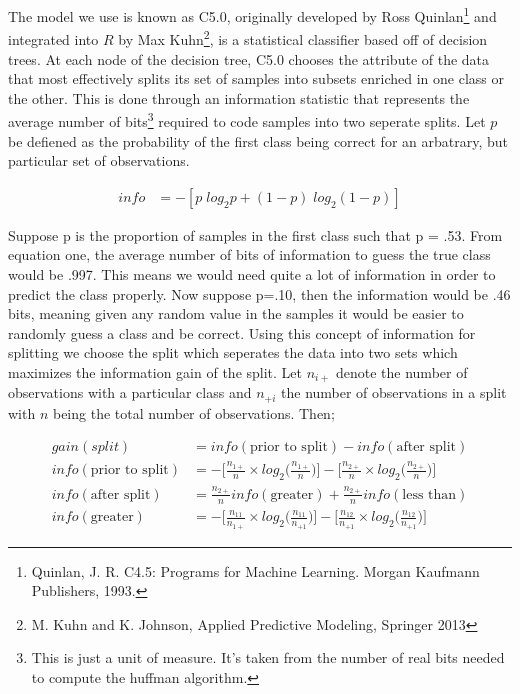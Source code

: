 \documentclass[11pt]{article}\usepackage[]{graphicx}\usepackage[]{color}
\begin{document}
The model we use is known as C5.0, originally developed by Ross Quinlan\footnote{Quinlan, J. R. C4.5: Programs for Machine Learning. Morgan Kaufmann Publishers, 1993.} and integrated into $R$ by Max Kuhn\footnote{M. Kuhn and K. Johnson, Applied Predictive Modeling, Springer 2013}, is a statistical classifier based off of decision trees. At each node of the decision tree, C5.0 chooses the attribute of the data that most effectively splits its set of samples into subsets enriched in one class or the other. This is done through an information statistic that represents the average number of bits\footnote{This is just a unit of measure. It's taken from the number of real bits needed to compute the huffman algorithm.} required to code samples into two seperate splits. Let $p$ be defiened as the probability of the first class being correct for an arbatrary, but particular set of observations.

\begin{align}
info&=-[p\;log_{2}p+(1-p)\;log_{2}(1-p)]
\end{align}

Suppose p is the proportion of samples in the first class such that p = .53. From equation one, the average number of bits of information to guess the true class would be .997. This means we would need quite a lot of information in order to predict the class properly. Now suppose p=.10, then the information would be .46 bits, meaning given any random value in the samples it would be easier to randomly guess a class and be correct. Using this concept of information for splitting we choose the split which seperates the data into two sets which maximizes the information gain of the split. Let $n_{i+}$ denote the number of observations with a particular class and $n_{+i}$ the number of observations in a split with $n$ being the total number of observations. Then;

\begin{align}
gain(split)&=info(\text{prior to split}) - info(\text{after split})\\
info(\text{prior to split})&=-\Big[\frac{n_{1+}}{n}\times{log_{2}\Big(\frac{n_{1+}}{n}\Big)}\Big] - \Big[\frac{n_{2+}}{n}\times{log_{2}\Big(\frac{n_{2+}}{n}\Big)}\Big]\\
info(\text{after split})&= \frac{n_{2+}}{n}info(\text{greater}) + \frac{n_{2+}}{n}info(\text{less than})\\
info(\text{greater})&= -\Big[\frac{n_{11}}{n_{1+}}\times{log_{2}\Big(\frac{n_{11}}{n_{+1}}\Big)}\Big]- \Big[\frac{n_{12}}{n_{+1}}\times{log_{2}\Big(\frac{n_{12}}{n_{+1}}\Big)}\Big]
\end{align}
\end{document}
